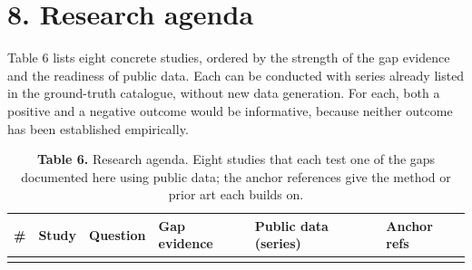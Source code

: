 \documentclass[11pt]{article}
\newenvironment{tablefont}{\par\scriptsize\setlength{\tabcolsep}{3.5pt}}{\par}
\newcommand{\thead}[1]{\textbf{#1}}
\begin{document}
\section{8. Research agenda}\label{research-agenda}

Table 6 lists eight concrete studies, ordered by the strength of the gap
evidence and the readiness of public data. Each can be conducted with
series already listed in the ground-truth catalogue, without new data
generation. For each, both a positive and a negative outcome would be
informative, because neither outcome has been established empirically.

\begin{tablefont}

\begin{longtable}[l]{@{}
  >{\raggedright\arraybackslash}p{}
  >{\raggedright\arraybackslash}p{}
  >{\raggedright\arraybackslash}p{}
  >{\raggedright\arraybackslash}p{}
  >{\raggedright\arraybackslash}p{}
  >{\raggedright\arraybackslash}p{}@{}}
\caption{\textbf{Table 6.} Research agenda. Eight studies that each test one of
the gaps documented here using public data; the anchor references give
the method or prior art each builds on.}\tabularnewline
\toprule
\begin{minipage}[b]{\linewidth}\raggedright
\thead{\#}
\end{minipage} & \begin{minipage}[b]{\linewidth}\raggedright
\thead{Study}
\end{minipage} & \begin{minipage}[b]{\linewidth}\raggedright
\thead{Question}
\end{minipage} & \begin{minipage}[b]{\linewidth}\raggedright
\thead{Gap evidence}
\end{minipage} & \begin{minipage}[b]{\linewidth}\raggedright
\thead{Public data (series)}
\end{minipage} & \begin{minipage}[b]{\linewidth}\raggedright
\thead{Anchor refs}
\end{minipage} \\
\midrule
\endfirsthead
\toprule
\begin{minipage}[b]{\linewidth}\raggedright

\end{minipage}
\end{longtable}
\end{tablefont}
\end{document}
